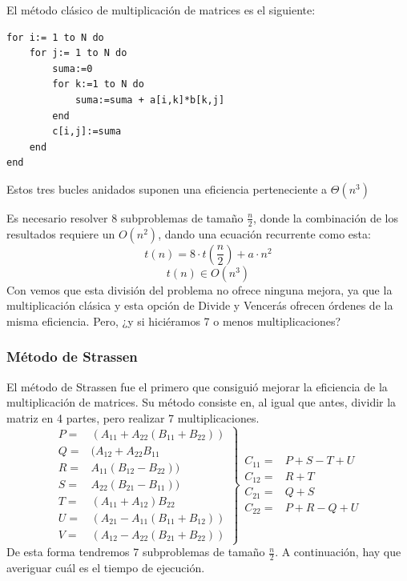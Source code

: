 \documentclass[10pt,a4paper,spanish]{report}
\theoremstyle{definition}
\theoremstyle{remark}
\begin{document}
El método clásico de multiplicación de matrices es el siguiente:

\begin{verbatim}
for i:= 1 to N do                      
    for j:= 1 to N do                  
        suma:=0                        
        for k:=1 to N do               
            suma:=suma + a[i,k]*b[k,j] 
        end                            
        c[i,j]:=suma                   
    end                                
end                                   
\end{verbatim}

Estos tres bucles anidados suponen una eficiencia perteneciente a $\Theta(n^3)$



Es necesario resolver 8 subproblemas de tamaño $\frac{n}{2}$, donde la combinación de los resultados requiere un $O(n^2)$, dando una ecuación recurrente como esta:
\begin{displaymath}
    t(n) = 8\cdot t\left(\frac{n}{2}\right) + a \cdot n^2
\end{displaymath}
\begin{displaymath}
    t(n) \in O(n^3)
\end{displaymath}
Con vemos que esta división del problema no ofrece ninguna mejora, ya que la multiplicación clásica y esta opción de Divide y Vencerás ofrecen órdenes de la misma eficiencia. Pero, ¿y si hiciéramos 7 o menos multiplicaciones?

\subsubsection{\textcolor[rgb]{0.2,0.5,0.5}Método de Strassen}

El método de Strassen fue el primero que consiguió mejorar la eficiencia de la multiplicación de matrices. Su método consiste en, al igual que antes, dividir la matriz en 4 partes, pero realizar 7 multiplicaciones.
\begin{displaymath}
\left.\begin{array}{cc}
    P = & (A_{11}+A_{22}(B_{11}+B_{22})) \\
    Q = & (A_{12}+A_{22}B_{11} \\
    R = &  A_{11}(B_{12}-B_{22}))\\
    S = &  A_{22}(B_{21}-B_{11}))\\
    T = &  (A_{11}+A_{12})B_{22}\\
    U = &  (A_{21}-A_{11}(B_{11}+B_{12}))\\
    V = &  (A_{12}-A_{22}(B_{21}+B_{22}))
\end{array} \right\}    
\begin{array}{cc}
    C_{11} = & P + S - T + U \\
    C_{12} = & R + T \\
    C_{21} = & Q + S \\
    C_{22} = &  P + R - Q + U
\end{array}  
\end{displaymath}
De esta forma tendremos 7 subproblemas de tamaño $\frac{n}{2}$. A continuación, hay que averiguar cuál es el tiempo de ejecución.
\end{document}
